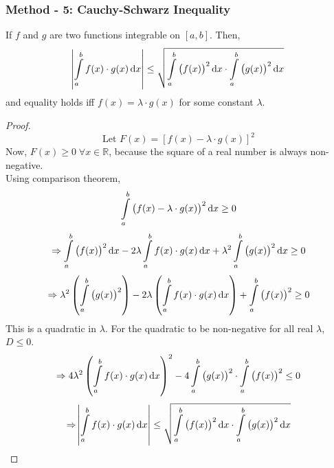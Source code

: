 \documentclass[14]{article}
\theoremstyle{definition}
\theoremstyle{case}
\begin{document}
\subsubsection{Method - 5: Cauchy-Schwarz Inequality}
If $f$ and $g$ are two functions integrable on $[a,b]$. Then,
\[\abs{\int\limits_a^b f(x) \cdot g(x) \dif x} \leq \sqrt{\int\limits_a^b \left( f(x) \right)^2 \dif x \cdot \int\limits_a^b \left( g(x) \right)^2 \dif x}\]
and equality holds iff $f(x) = \lambda \cdot g(x)$ for some constant $\lambda$.
\begin{proof}
\[\text{Let } F(x) = \left[ f(x) - \lambda \cdot g(x) \right]^2\]
Now, $F(x) \geq 0 \; \forall x \in \mathbb{R}$, because the square of a real number is always non-negative.\\
Using comparison theorem,
\[\int\limits_a^b \left( f(x) - \lambda \cdot g(x) \right)^2 \dif x \geq 0\]
\[\Rightarrow \int\limits_a^b \left(f(x) \right)^2 \dif x - 2\lambda \int\limits_a^b f(x) \cdot g(x) \dif x + \lambda^2 \int\limits_a^b \left(g(x)\right)^2 \dif x \geq 0\]
\[\Rightarrow \lambda^2 \left( \int\limits_a^b \left(g(x)\right)^2 \right) - 2\lambda \left(\int\limits_a^b f(x) \cdot g(x) \dif x \right) + \int\limits_a^b \left(f(x) \right)^2 \geq 0\]
This is a quadratic in $\lambda$. For the quadratic to be non-negative for all real $\lambda$, $D \leq 0$.
\[\Rightarrow 4 \lambda^2 \left( \int\limits_a^b f(x) \cdot g(x) \dif x \right)^2 - 4 \int\limits_a^b \left(g(x)\right)^2 \cdot \int\limits_a^b \left(f(x) \right)^2 \leq 0\]
\[\Rightarrow \abs{\int\limits_a^b f(x) \cdot g(x) \dif x} \leq \sqrt{\int\limits_a^b \left( f(x) \right)^2 \dif x \cdot \int\limits_a^b \left( g(x) \right)^2 \dif x}\]
\end{proof}
\pagebreak
\end{document}
